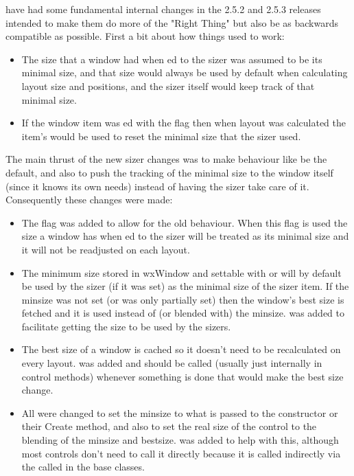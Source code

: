 
 have had some fundamental internal changes in the 2.5.2 and 2.5.3 releases intended to make them do more of the "Right Thing" but also be as backwards compatible as possible. First a bit about how things used to work:

\begin{itemize}\itemsep=0pt
\item The size that a window had when ed to the sizer was assumed to be its minimal size, and that size would always be used by default when calculating layout size and positions, and the sizer itself would keep track of that minimal size.
\item If the window item was ed with the  flag then when layout was calculated the item's  would be used to reset the minimal size that the sizer used.
\end{itemize}

The main thrust of the new sizer changes was to make behaviour like  be the default, and also to push the tracking of the minimal size to the window itself (since it knows its own needs) instead of having the sizer take care of it.  Consequently these changes were made:

\begin{itemize}\itemsep=0pt
\item The  flag was added to allow for the old behaviour.  When this flag is used the size a window has when ed to the sizer will be treated as its minimal size and it will not be readjusted on each layout.
\item The minimum size stored in wxWindow and settable with  or  will by default be used by the sizer (if it was set) as the minimal size of the sizer item.  If the minsize was not set (or was only partially set) then the window's best size is fetched and it is used instead of (or blended with) the minsize.   was added to facilitate getting the size to be used by the sizers.
\item The best size of a window is cached so it doesn't need to be recalculated on every layout.  was added and should be called (usually just internally in control methods) whenever something is done that would make the best size change.
\item All  were changed to set the minsize to what is passed to the constructor or their Create method, and also to set the real size of the control to the blending of the minsize and bestsize.   was added to help with this, although most controls don't need to call it directly because it is called indirectly via the  called in the base classes.
\end{itemize}

